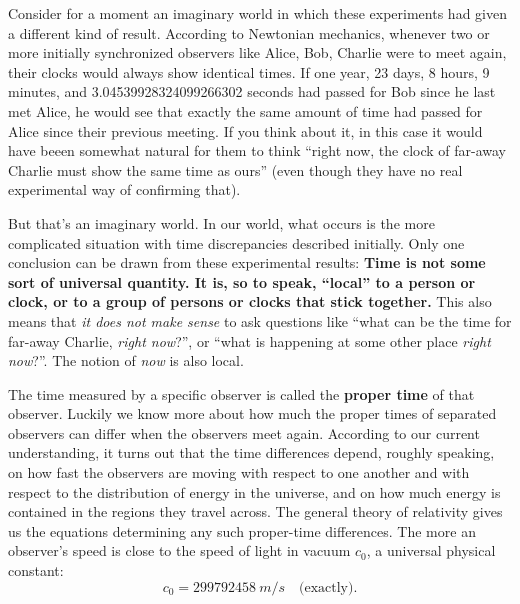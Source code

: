 \documentclass[a4paper,12pt,%
onecolumn,oneside,titlepage,%
british%
]{memoir}
\renewcommand*{\|}[1][]{\nonscript\:#1\vert\nonscript\:\mathopen{}}
\newcommand*{\yc}{c_{0}} %
\begin{document}
Consider for a moment an imaginary world in which these experiments had given a different kind of result. According to Newtonian mechanics, whenever two or more initially synchronized observers like Alice, Bob, Charlie were to meet again, their clocks would always show identical times. If one year, 23 days, 8 hours, 9 minutes, and \num{3.04539928324099266302} seconds had passed for Bob since he last met Alice, he would see that exactly the same amount of time had passed for Alice since their previous meeting. If you think about it, in this case it would have beeen somewhat natural for them to think \enquote{right now, the clock of far-away Charlie must show the same time as ours} (even though they have no real experimental way of confirming that).

But that's an imaginary world. In our world, what occurs is the more complicated situation with time discrepancies described initially. Only one conclusion can be drawn from these experimental results: \textbf{Time is not some sort of universal quantity. It is, so to speak, \enquote{local} to a person or clock, or to a group of persons or clocks that stick together.} This also means that \emph{it does not make sense} to ask questions like \enquote{what can be the time for far-away Charlie, \emph{right now}?}, or \enquote{what is happening at some other place \emph{right now}?}. The notion of \emph{now} is also local.


The time measured by a specific observer is called the \textbf{proper time} of that observer. Luckily we know more about how much the proper times of separated observers can differ when the observers meet again. According to our current understanding, it turns out that the time differences depend, roughly speaking, on how fast the observers are moving with respect to one another and with respect to the distribution of energy in the universe, and on how much energy is contained in the regions they travel across. The general theory of relativity gives us the equations determining any such proper-time differences. The more an observer's speed is close to the speed of light in vacuum $\yc$, a universal physical constant:
\begin{equation}
  \label{eq:c}
  \yc = \qty{299792458}{m/s}\quad\text{(exactly).}
\end{equation}
\end{document}

